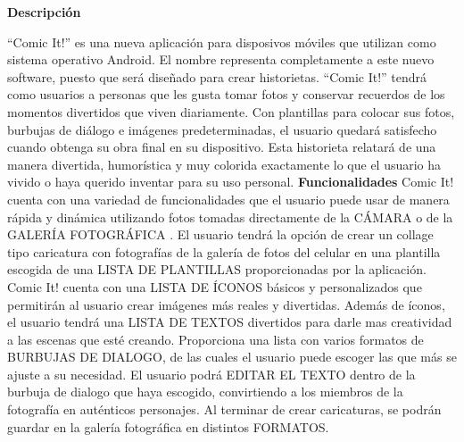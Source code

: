 \documentclass[12pt]{report}
\begin{document}
	
\newpage
	\begingroup
		\large{
			\textbf{
				Descripción
				\newline
				\newline
			}
		}
	\endgroup

``Comic It!'' es una nueva aplicación para disposivos móviles que utilizan como sistema operativo Android. El nombre representa completamente a este nuevo software, puesto que será diseñado para crear historietas.
\newline
\newline
``Comic It!'' tendrá como usuarios a personas que les gusta tomar fotos y conservar recuerdos de los momentos divertidos que viven diariamente.
\newline
\newline
Con plantillas para colocar sus fotos, burbujas de diálogo e imágenes predeterminadas, el usuario quedará satisfecho cuando obtenga su obra final en su dispositivo.
\newline
\newline
Esta historieta relatará de una manera divertida, humorística y muy colorida exactamente lo que el usuario ha vivido o haya querido inventar para su uso personal.
	\newline
	\newline
	\newline
	\begingroup
		\large{
			\textbf{
				Funcionalidades
				\newline
				\newline
			}
		}
	\endgroup
\newline
Comic It! cuenta con una variedad de funcionalidades que el usuario puede usar de manera rápida y dinámica utilizando 				fotos tomadas directamente de la CÁMARA o de la GALERÍA FOTOGRÁFICA .
\newline
\newline
El usuario tendrá la opción de crear un collage tipo caricatura  con fotografías de la galería de fotos del celular en una plantilla escogida de una LISTA DE PLANTILLAS proporcionadas por la aplicación.
\newline
\newline
Comic It! cuenta con una LISTA DE ÍCONOS básicos y personalizados que permitirán al usuario crear imágenes más reales y divertidas.	
\newline
\newline	
Además de íconos, el usuario tendrá una LISTA DE TEXTOS divertidos para darle mas creatividad a las escenas que esté creando.
\newline
\newline
Proporciona una lista con varios formatos de BURBUJAS DE DIALOGO, de las cuales el usuario puede escoger las que más se ajuste a su necesidad. El usuario podrá EDITAR EL TEXTO dentro de la burbuja de dialogo que haya escogido, convirtiendo a los miembros de 		la fotografía en auténticos personajes.
\newline
\newline
Al terminar de crear caricaturas, se podrán guardar en la galería fotográfica en distintos FORMATOS.
\end{document}
